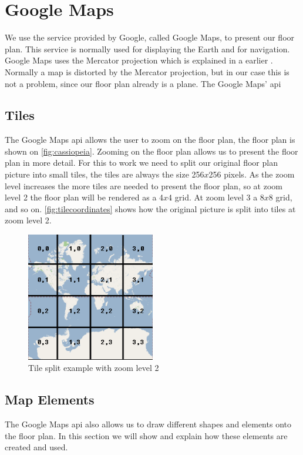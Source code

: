 \section{Google Maps}
 We use the service provided by Google, called Google Maps, to present our floor plan. This service is normally used for displaying the Earth and for navigation. Google Maps uses the Mercator projection which is explained in a earlier . Normally a map is distorted by the Mercator projection, but in our case this is not a problem, since our floor plan already is a plane. The Google Maps' \ac{api}  
\subsection*{Tiles}
The Google Maps \ac{api} allows the user to zoom on the floor plan, the floor plan is shown on \autoref{fig:cassiopeia}. Zooming on the floor plan allows us to present the floor plan in more detail. For this to work we need to split our original floor plan picture into small tiles, the tiles are always the size 256$x$256 pixels. As the zoom level increases the more tiles are needed to present the floor plan, so at zoom level 2 the floor plan will be rendered as  a 4$x$4 grid. At zoom level 3 a 8$x$8 grid, and so on. \autoref{fig:tilecoordinates} shows how the original picture is split into tiles at zoom level 2.

\begin{figure}[H]
\centering
\includegraphics[width=0.5\textwidth]{img/tilecoordinates.png}
\caption{Tile split example with zoom level 2 \citep{tilecoordinates}}
\label{fig:tilecoordinates}
\end{figure}

\subsection*{Map Elements}
The Google Maps \ac{api} also allows us to draw different shapes and elements onto the floor plan. In this section we will show and explain how these elements are created and used.
